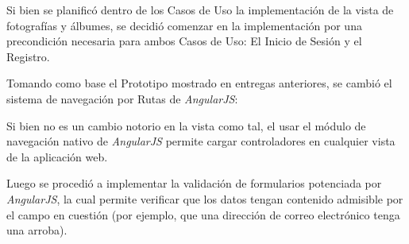 \documentclass{memoria}
\begin{document}
Si bien se planificó dentro de los Casos de Uso la implementación de la vista de fotografías y álbumes, se decidió comenzar en la implementación por una precondición necesaria para ambos Casos de Uso: El Inicio de Sesión y el Registro.

Tomando como base el Prototipo mostrado en entregas anteriores, se cambió el sistema de navegación por Rutas de \textsl{AngularJS}:


Si bien no es un cambio notorio en la vista como tal, el usar el módulo de navegación nativo de \textsl{AngularJS} permite cargar controladores en cualquier vista de la aplicación web.

Luego se procedió a implementar la validación de formularios potenciada por \textsl{AngularJS}, la cual permite verificar que los datos tengan contenido admisible por el campo en cuestión (por ejemplo, que una dirección de correo electrónico tenga una arroba).

\end{document}
